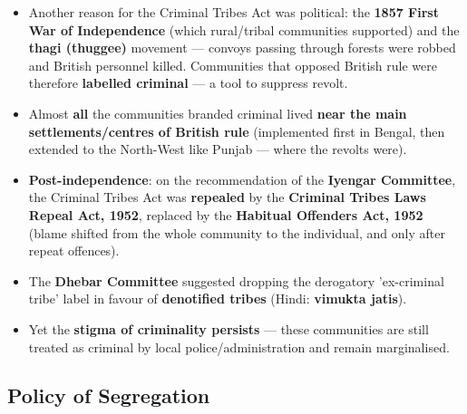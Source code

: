 \begin{CriticalPoint}
\begin{itemize}
\item Another reason for the Criminal Tribes Act was political: the \textbf{1857 First War of Independence} (which rural/tribal communities supported) and the \textbf{thagi (thuggee)} movement --- convoys passing through forests were robbed and British personnel killed. Communities that opposed British rule were therefore \textbf{labelled criminal} --- a tool to suppress revolt.
\item Almost \textbf{all} the communities branded criminal lived \textbf{near the main settlements/centres of British rule} (implemented first in Bengal, then extended to the North-West like Punjab --- where the revolts were).
\end{itemize}
\end{CriticalPoint}

\begin{GovtPolicy}
\begin{itemize}
\item \textbf{Post-independence}: on the recommendation of the \textbf{Iyengar Committee}, the Criminal Tribes Act was \textbf{repealed} by the \textbf{Criminal Tribes Laws Repeal Act, 1952}, replaced by the \textbf{Habitual Offenders Act, 1952} (blame shifted from the whole community to the individual, and only after repeat offences).
\item The \textbf{Dhebar Committee} suggested dropping the derogatory 'ex-criminal tribe' label in favour of \textbf{denotified tribes} (Hindi: \textbf{vimukta jatis}).
\item Yet the \textbf{stigma of criminality persists} --- these communities are still treated as criminal by local police/administration and remain marginalised.
\end{itemize}
\end{GovtPolicy}

\subsection{Policy of Segregation}

